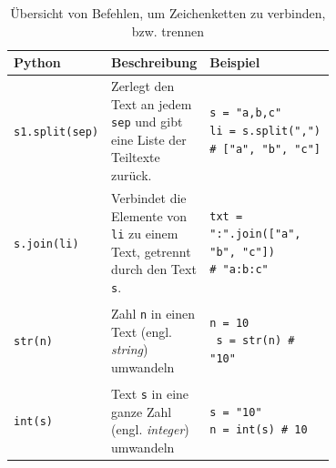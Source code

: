  \newpage
 

 \begin{table}[H]
 \centering
 \begin{tabular}{l|p{0.3\linewidth}|p{0.4\linewidth}}
 \textbf{Python} & \textbf{Beschreibung} & \textbf{Beispiel} \\\midrule\midrule
 
 \lstinline|s1.split(sep)| & Zerlegt den Text an jedem \texttt{sep} und gibt eine Liste der Teiltexte zurück.  & \begin{minipage}{\linewidth}
 \begin{lstlisting}[numbers=none]
s = "a,b,c"
li = s.split(",") 
# ["a", "b", "c"]
\end{lstlisting}
 \end{minipage}\\\midrule
  \lstinline|s.join(li)| & Verbindet die Elemente von \texttt{li} zu einem Text, getrennt durch den Text \texttt{s}.  & \begin{minipage}{\linewidth}
  \begin{lstlisting}[numbers=none]
txt = ":".join(["a", "b", "c"]) 
# "a:b:c"
\end{lstlisting}
  \end{minipage}\\\midrule
   \lstinline|str(n)| & Zahl \texttt{n} in einen Text (engl. \textit{string}) umwandeln  & \begin{minipage}{\linewidth}
   \begin{lstlisting}[numbers=none]
 n = 10
 s = str(n) # "10"
\end{lstlisting}
   \end{minipage}\\\midrule
    \lstinline|int(s)| & Text \texttt{s} in eine ganze Zahl (engl. \textit{integer}) umwandeln  & \begin{minipage}{\linewidth}
    \begin{lstlisting}[numbers=none]
s = "10"
n = int(s) # 10
\end{lstlisting}
    \end{minipage}
 \end{tabular}
 \caption{Übersicht von Befehlen, um Zeichenketten zu verbinden, bzw. trennen}
 \label{tab:string-sep-merge}
 \end{table}
